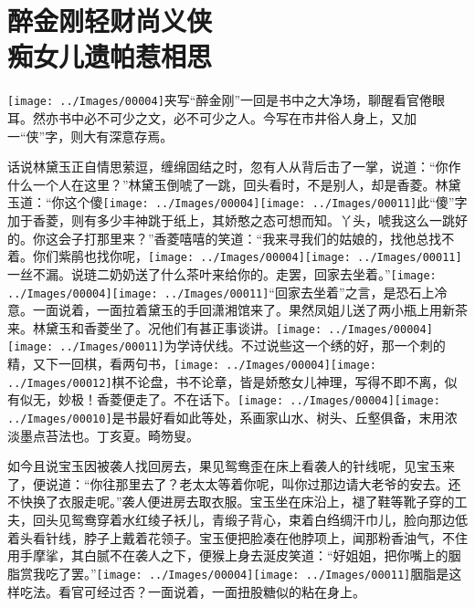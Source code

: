 

\chapter{醉金刚轻财尚义侠\\痴女儿遗帕惹相思}\label{part0028_split_000.htmlux5cux23calibre_pb_0}

{}

{\texttt{[image: ../Images/00004]}夹写``醉金刚''一回是书中之大净场，聊醒看官倦眼耳。然亦书中必不可少之文，必不可少之人。今写在市井俗人身上，又加一``侠''字，则大有深意存焉。}

话说林黛玉正自情思萦逗，缠绵固结之时，忽有人从背后击了一掌，说道：``你作什么一个人在这里？''林黛玉倒唬了一跳，回头看时，不是别人，却是香菱。林黛玉道：``你这个傻{\texttt{[image: ../Images/00004]}\texttt{[image: ../Images/00011]}\footnotesize \kaishu 此``傻''字加于香菱，则有多少丰神跳于纸上，其娇憨之态可想而知。}丫头，唬我这么一跳好的。你这会子打那里来？''香菱嘻嘻的笑道：``我来寻我们的姑娘的，找他总找不着。你们紫鹃也找你呢，{\texttt{[image: ../Images/00004]}\texttt{[image: ../Images/00011]}\footnotesize \kaishu 一丝不漏。}说琏二奶奶送了什么茶叶来给你的。走罢，回家去坐着。''{\texttt{[image: ../Images/00004]}\texttt{[image: ../Images/00011]}\footnotesize \kaishu ``回家去坐着''之言，是恐石上冷意。}一面说着，一面拉着黛玉的手回潇湘馆来了。果然凤姐儿送了两小瓶上用新茶来。林黛玉和香菱坐了。况他们有甚正事谈讲。{\texttt{[image: ../Images/00004]}\texttt{[image: ../Images/00011]}\footnotesize \kaishu 为学诗伏线。}不过说些这一个绣的好，那一个刺的精，又下一回棋，看两句书，{\texttt{[image: ../Images/00004]}\texttt{[image: ../Images/00012]}\footnotesize \kaishu 棋不论盘，书不论章，皆是娇憨女儿神理，写得不即不离，似有似无，妙极！}香菱便走了。不在话下。{\texttt{[image: ../Images/00004]}\texttt{[image: ../Images/00010]}\footnotesize \kaishu 是书最好看如此等处，系画家山水、树头、丘壑俱备，末用浓淡墨点苔法也。丁亥夏。畸笏叟。}

如今且说宝玉因被袭人找回房去，果见鸳鸯歪在床上看袭人的针线呢，见宝玉来了，便说道：``你往那里去了？老太太等着你呢，叫你过那边请大老爷的安去。还不快换了衣服走呢。''袭人便进房去取衣服。宝玉坐在床沿上，褪了鞋等靴子穿的工夫，回头见鸳鸯穿着水红绫子袄儿，青缎子背心，束着白绉绸汗巾儿，脸向那边低着头看针线，脖子上戴着花领子。宝玉便把脸凑在他脖项上，闻那粉香油气，不住用手摩挲，其白腻不在袭人之下，便猴上身去涎皮笑道：``好姐姐，把你嘴上的胭脂赏我吃了罢。''{\texttt{[image: ../Images/00004]}\texttt{[image: ../Images/00011]}\footnotesize \kaishu 胭脂是这样吃法。看官可经过否？}一面说着，一面扭股糖似的粘在身上。

